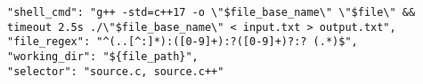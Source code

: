 \vspace{-4.5mm}
\begin{verbatim}
"shell_cmd": "g++ -std=c++17 -o \"$file_base_name\" \"$file\" && timeout 2.5s ./\"$file_base_name\" < input.txt > output.txt",
"file_regex": "^(..[^:]*):([0-9]+):?([0-9]+)?:? (.*)$",
"working_dir": "${file_path}",
"selector": "source.c, source.c++"
\end{verbatim}
